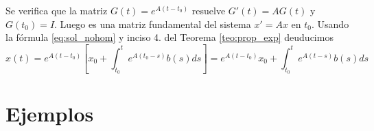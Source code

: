 \begin{demo} Se verifica que la matriz  $G(t)=e^{A(t-t_0)}$ resuelve $G'(t)=AG(t)$ y $G(t_0)=I$. Luego es una matriz fundamental del sistema $x'=Ax$ en $t_0$. Usando la fórmula \eqref{eq:sol_nohom} y  inciso 4. del Teorema \ref{teo:prop_exp} deuducimos
\[
 x(t)=e^{A(t-t_0)}\left[x_0 +\int_{t_0}^t e^{A(t_0-s)}b(s)ds\right]=e^{A(t-t_0)}x_0 +\int_{t_0}^t e^{A(t-s)}b(s)ds
\]

\end{demo}








\section{Ejemplos}

